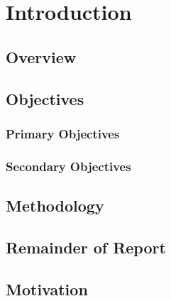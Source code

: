 \chapter{Introduction}
\label{introduction}

\section{Overview}	%
\section{Objectives}
	\subsection{Primary Objectives}
	\subsection{Secondary Objectives}
\section{Methodology}	%
\section{Remainder of Report}	%
\section{Motivation}
